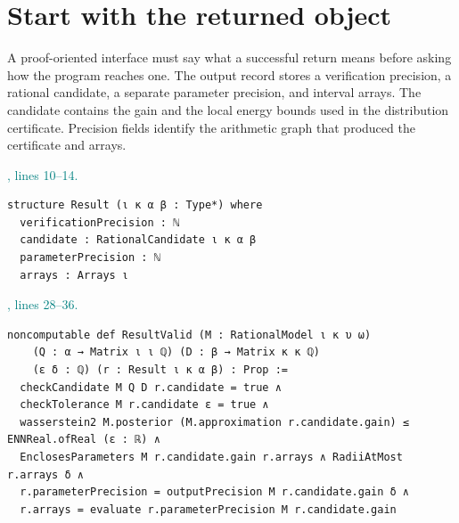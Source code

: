\documentclass[11pt]{article}\usepackage{needspace}\renewcommand{\paperkind}{Lean companion}\setlength{\parskip}{0.35em}
\begin{document}
\clearpage\section{Start with the returned object}

A proof-oriented interface must say what a successful return means before asking how the program reaches one. The output record stores a verification precision, a rational candidate, a separate parameter precision, and interval arrays. The candidate contains the gain and the local energy bounds used in the distribution certificate. Precision fields identify the arithmetic graph that produced the certificate and arrays.



{\small\textcolor{teal}{, lines 10--14.}\par}

\begin{lstlisting}[style=BayesSource]
structure Result (ι κ α β : Type*) where
  verificationPrecision : ℕ
  candidate : RationalCandidate ι κ α β
  parameterPrecision : ℕ
  arrays : Arrays ι
\end{lstlisting}



{\small\textcolor{teal}{, lines 28--36.}\par}

\begin{lstlisting}[style=BayesSource]
noncomputable def ResultValid (M : RationalModel ι κ υ ω)
    (Q : α → Matrix ι ι ℚ) (D : β → Matrix κ κ ℚ)
    (ε δ : ℚ) (r : Result ι κ α β) : Prop :=
  checkCandidate M Q D r.candidate = true ∧
  checkTolerance M r.candidate ε = true ∧
  wasserstein2 M.posterior (M.approximation r.candidate.gain) ≤ ENNReal.ofReal (ε : ℝ) ∧
  EnclosesParameters M r.candidate.gain r.arrays ∧ RadiiAtMost r.arrays δ ∧
  r.parameterPrecision = outputPrecision M r.candidate.gain δ ∧
  r.arrays = evaluate r.parameterPrecision M r.candidate.gain
\end{lstlisting}
\end{document}
